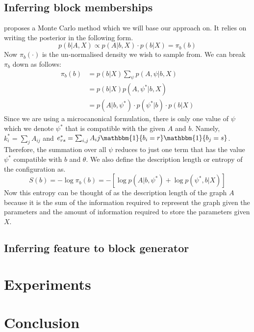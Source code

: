 \documentclass{article}
\newcommand{\one}{\mathbbm{1}}
\begin{document}
\subsection{Inferring block memberships}

\citet{Peixoto-MCMC} proposes a Monte Carlo method which we will base our approach on. It relies on writing the posterior in the following form.
%
\begin{equation}
	p(b | A, X) \propto p(A | b, X) \cdot p(b | X) = \pi_b(b)
\end{equation}
%
Now $\pi_b(\cdot)$ is the un-normalised density we wish to sample from. We can break $\pi_b$ down as follows:
%
\begin{align*}
	\pi_b(b) &= p(b|X) \sum_{\psi} \nolimits p(A , \psi | b, X) \\
	&= p(b|X) p(A, \psi^* | b, X) \\
	&= p(A | b, \psi^*) \cdot p(\psi^* | b) \cdot p(b | X)
\end{align*}
%
Since we are using a microcanonical formulation, there is only one value of $\psi$ which we denote $\psi^*$ that is compatible with the given $A$ and $b$. Namely, $k^*_i = \sum_j A_{ij} $ and $e^*_{rs} = \sum_{i, j} A_ij \one \{b_i=r\} \one\{b_j=s\}$. Therefore, the summation over all $\psi$ reduces to just one term that has the value $\psi^*$ compatible with $b$ and $\theta$. We also define the description length or entropy of the configuration as.
%
\begin{equation}
	S(b) = - \log \pi_b(b) = - \left[ \log p(A | b, \psi^*) + \log p(\psi^*, b | X) \right]
\end{equation}
%
Now this entropy can be thought of as the description length of the graph $A$ because it is the sum of the information required to represent the graph given the parameters and the amount of information required to store the parameters given $X$.

\subsection{Inferring feature to block generator}


\section{Experiments}

\section{Conclusion}
\end{document}
